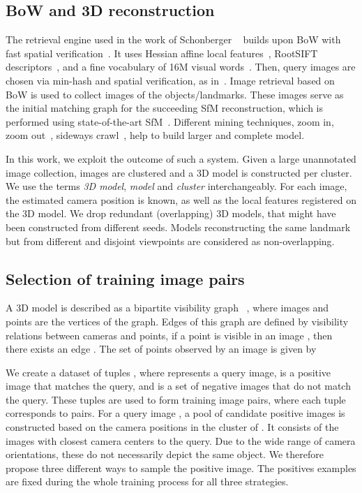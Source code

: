 \documentclass[runningheads]{llncs}
\begin{document}
\subsection{BoW and 3D reconstruction}
The retrieval engine used in the work of Schonberger \etal~\cite{SRCF15} builds upon BoW with fast spatial verification~\cite{PCISZ07}. 
It uses Hessian affine local features~\cite{MTSZMSKG05}, \mbox{RootSIFT} descriptors~\cite{AZ12}, and a fine vocabulary of 16M visual words~\cite{MPCM13}.
Then, query images are chosen via min-hash and spatial verification, as in~\cite{CM10a}. 
Image retrieval based on BoW is used to collect images of the objects/landmarks.
These images serve as the initial matching graph for the succeeding SfM reconstruction, which is performed using state-of-the-art SfM~\cite{FGGJR10,AFSS+11}. Different mining techniques, \eg zoom in, zoom out~\cite{MCM13,MRCM14}, sideways crawl~\cite{SRCF15}, help to build larger and complete model. 

In this work, we exploit the outcome of such a system. 
Given a large unannotated image collection, images are clustered and a 3D model is constructed per cluster.
We use the terms \emph{3D model}, \emph{model} and \emph{cluster} interchangeably.
For each image, the estimated camera position is known, as well as the local features registered on the 3D model. 
We drop redundant (overlapping) 3D models, that might have been constructed from different seeds.
Models reconstructing the same landmark but from different and disjoint viewpoints are considered as non-overlapping.

\subsection{Selection of training image pairs}

A 3D model is described as a bipartite visibility graph ~\cite{LSH10}, where images  and points  are the vertices of the graph. 
Edges of this graph are defined by visibility relations between cameras and points, \ie if a point  is visible in an image , then there exists an edge . 
The set of points observed by an image  is given by
 


We create a dataset of tuples , where  represents a query image,  is a positive image that matches the query, and  is a set of negative images that do not match the query.
These tuples are used to form training image pairs, where each tuple corresponds to  pairs. 
For a query image , a pool  of candidate positive images is constructed based on the camera positions in the cluster of .
It consists of the  images with closest camera centers to the query.
Due to the wide range of camera orientations, these do not necessarily depict the same object. 
We therefore propose three different ways to sample the positive image.
The positives examples are fixed during the whole training process for all three strategies.
\end{document}
